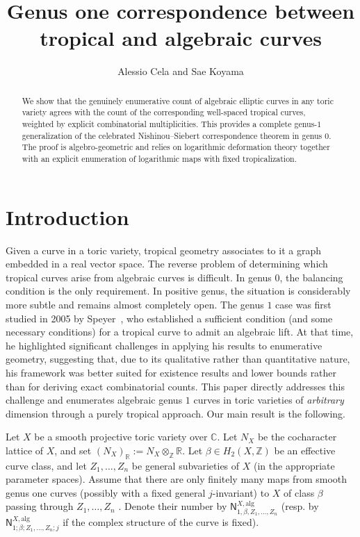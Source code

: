 \documentclass{article}
\title{Genus one correspondence between tropical and algebraic curves}
\author{Alessio Cela and Sae Koyama}
\date{ }
\def\Z{\mathbb{Z}}
\def\C{\mathbb{C}}
\def\R{\mathbb{R}}
\begin{document}
\maketitle

\begin{abstract}

We show that the genuinely enumerative count of algebraic elliptic curves in any toric variety agrees with the count of the corresponding well-spaced tropical curves, weighted by explicit combinatorial multiplicities. This provides a complete genus-$1$ generalization of the celebrated Nishinou--Siebert correspondence theorem in genus $0$. The proof is algebro-geometric and relies on logarithmic deformation theory together with an explicit enumeration of logarithmic maps with fixed tropicalization.

 
\end{abstract}
\tableofcontents


\section{Introduction}



Given a curve in a toric variety, tropical geometry associates to it a graph embedded in a real vector space. The reverse problem of determining which tropical curves arise from algebraic curves is difficult. In genus $0$, the balancing condition is the only requirement. In positive genus, the situation is considerably more subtle and remains almost completely open. The genus $1$ case was first studied in 2005 by Speyer~\cite{Speyer-PhD, Speyer}, who established a sufficient condition (and some necessary conditions) for a tropical curve to admit an algebraic lift. At that time, he highlighted significant challenges in applying his results to enumerative geometry, suggesting that, due to its qualitative rather than quantitative nature, his framework was better suited for existence results and lower bounds rather than for deriving exact combinatorial counts. This paper directly addresses this challenge and enumerates algebraic genus $1$ curves in toric varieties of \emph{arbitrary} dimension through a purely tropical approach. Our main result is the following.

Let $X$ be a smooth projective toric variety over $\C$. Let $N_X$ be the cocharacter lattice of $X$, and set $(N_X)_\R := N_X \otimes_{\Z} \R$. Let $\beta \in H_2(X,\Z)$ be an effective curve class, and let $Z_1,\ldots,Z_n$ be general subvarieties of $X$ (in the appropriate parameter spaces). Assume that there are only finitely many maps from smooth genus one curves (possibly with a fixed general $j$-invariant) to $X$ of class $\beta$ passing through $Z_1,\ldots,Z_n$ . Denote their number by
$
\mathsf{N}^{X,\mathrm{alg}}_{1,\beta,Z_1,\ldots,Z_n}
$ (resp. by $
\mathsf{N}^{X,\mathrm{alg}}_{1;\beta;Z_1,\ldots,Z_n;j}$ if the complex structure of the curve is fixed).
\end{document}
